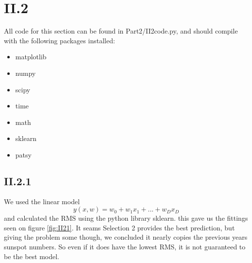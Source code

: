 \documentclass{article}
\begin{document}
\section{II.2}
All code for this section can be found in Part2/II2code.py, and should compile with the following packages installed:
\begin{itemize}
    \item matplotlib
    \item numpy
    \item scipy
    \item time
    \item math
    \item sklearn
    \item patsy
\end{itemize}

\subsection{II.2.1}

We used the linear model
\begin{equation*}
    y(x, w) = w_0 + w_1 x_1 + ... + w_D x_D
\end{equation*}
and calculated the RMS using the python library sklearn. this gave us the fittings seen on 
figure \ref{fig:II21}. It seams Selection 2 provides the best prediction, but giving the problem some though, we concluded it nearly copies
the previous years sunspot numbers. So even if it does have the lowest RMS, it is not guaranteed to be the best model.
\end{document}
